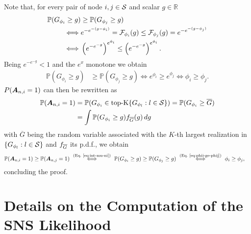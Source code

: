 Note that, for every pair of node $i,j\in\mathcal{S}$ and scalar $g\in\mathbb R$
\begin{align}
    \mathbb P(G_{\phi_i}\ge g) &\ge \mathbb P(G_{\phi_j}\ge g)\\
        \iff&e^{-e^{-(g-\phi_i)}}=\mathcal{F}_{\phi_i}(g) \le \mathcal{F}_{\phi_j}(g)=e^{-e^{-(g-\phi_j)}} \\
        \iff&\left({e^{-e^{-g}}}\right)^{e^{\phi_i}} \le \left({e^{-e^{-g}}}\right)^{e^{\phi_i}}.
\end{align}
Being ${e^{-e^{-g}}}<1$ and the $e^x$ monotone we obtain
\begin{align}
    \mathbb P(G_{\phi_i}\ge g) &\ge \mathbb P(G_{\phi_j}\ge g)
    \iff e^{\phi_i} \ge e^{\phi_j}
    \iff \phi_i \ge \phi_j. \label{eq:phii-ge-phij}
\end{align}
$P({\bm{A}}_{n,i}=1)$ can then be rewritten as
\begin{align}
    \mathbb P({\bm{A}}_{n,i}=1) 
    &=\mathbb P(G_{\phi_i}\in \operatorname*{top-K}\{G_{\phi_l}:l\in\mathcal{S}\}) 
    =\mathbb P(G_{\phi_i}\ge \overline G)
    \\&=\int \mathbb P(G_{\phi_i}\ge g) f_{\overline G}(g)\, dg  \label{eq:int-mu-ni}
\end{align}
with $\overline G$ being the random variable associated with the $K$-th largest realization in $\{G_{\phi_l}:l\in\mathcal{S}\}$ and $f_{\overline G}$ its p.d.f., we obtain
\begin{align}
    \mathbb P({\bm{A}}_{n,i}=1) &\ge \mathbb P({\bm{A}}_{n,j}=1) 
    \ \stackrel{(\text{Eq.~\ref{eq:int-mu-ni})}}{\iff}\  \mathbb P(G_{\phi_i}\ge g) \ge \mathbb P(G_{\phi_j}\ge g)
    \ \stackrel{\text{(Eq.~\ref{eq:phii-ge-phij})}}{\iff}\  \phi_i \ge \phi_j,
\end{align}
concluding the proof.


\section{Details on the Computation of the SNS Likelihood}\label{a:trapezoid}

